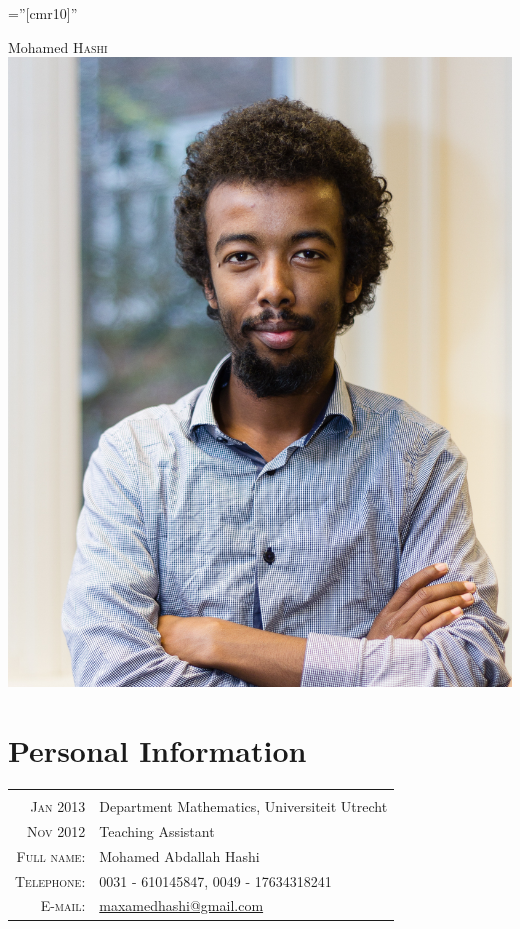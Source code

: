 \documentclass[a4paper,10pt]{article}
\begin{document}
\pagestyle{empty} %

\font\fb=''[cmr10]'' %

\par{\centering
		{\Huge Mohamed \textsc{Hashi}
	}\bigskip \includegraphics[scale=0.075]{RiskCo16.jpg}
	\par}



\section{Personal Information}

\begin{tabular}{rl}
 \multicolumn{2}{c}{} \\
\textsc{Jan 2013} & Department Mathematics, Universiteit Utrecht \\
\textsc{Nov 2012} & Teaching Assistant\\
    \textsc{Full name:} & Mohamed Abdallah Hashi\\
    \textsc{Telephone:}     & 0031 - 610145847, 0049 - 17634318241\\
    \textsc{E-mail:}     & \href{mailto:maxamedhashi@gmail.com}{maxamedhashi@gmail.com}
\end{tabular}
\end{document}
